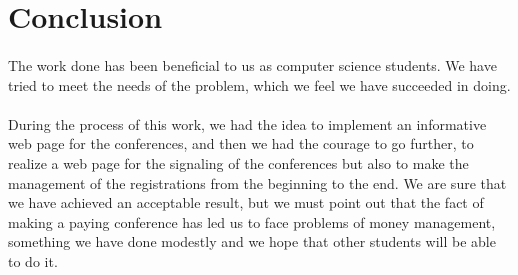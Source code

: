\section{Conclusion}
	\paragraph{}
	The work done has been beneficial to us as computer science students. We have tried to meet the needs of the problem, which we feel we have succeeded in doing.
	\paragraph{}
	During the process of this work, we had the idea to implement an informative web page for the conferences, and then we had the courage to go further, to realize a web page for the signaling of the conferences but also to make the management of the registrations from the beginning to the end. We are sure that we have achieved an acceptable result, but we must point out that the fact of making a paying conference has led us to face problems of money management, something we have done modestly and we hope that other students will be able to do it.
